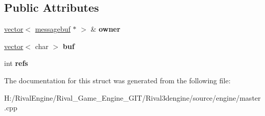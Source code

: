 \subsection*{Public Attributes}
\begin{DoxyCompactItemize}
\item 
\mbox{\label{structmessagebuf_a12ba578b5404f3fd0d5bb5510418c78d}} 
\hyperlink{structvector}{vector}$<$ \hyperlink{structmessagebuf}{messagebuf} $\ast$ $>$ \& {\bfseries owner}
\item 
\mbox{\label{structmessagebuf_a099e0b8be4f3e41401ea4080cfe2a4d9}} 
\hyperlink{structvector}{vector}$<$ char $>$ {\bfseries buf}
\item 
\mbox{\label{structmessagebuf_a51f9c7bd566099cb7c7ca5625547eeb2}} 
int {\bfseries refs}
\end{DoxyCompactItemize}


The documentation for this struct was generated from the following file\+:\begin{DoxyCompactItemize}
\item 
H\+:/\+Rival\+Engine/\+Rival\+\_\+\+Game\+\_\+\+Engine\+\_\+\+G\+I\+T/\+Rival3dengine/source/engine/master.\+cpp\end{DoxyCompactItemize}
